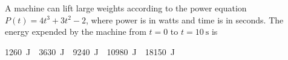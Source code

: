 \documentclass{../../../oss-apphys-exam}
\newcounter{lastmc}
\begin{document}
\begin{questions}
%
%
    
  \question A machine can lift large weights according to the power equation
  $P(t)=4t^3+3t^2-2$, where power is in watts and time is in seconds. The
  energy expended by the machine from $t=0$ to $t=\SI{10}{\second}$ is
  \begin{choices}
    \choice \SI{1260}\joule
    \choice \SI{3630}\joule
    \choice \SI{9240}\joule
    \choice \SI{10980}\joule
    \choice \SI{18150}\joule
  \end{choices}
\end{questions}
\setcounter{lastmc}{\value{question}}
\newpage
\end{document}
